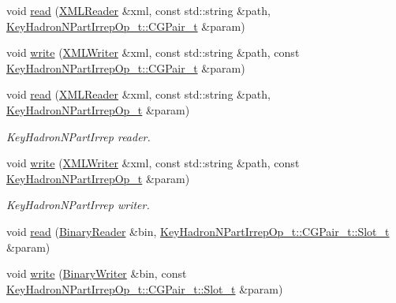\begin{DoxyCompactItemize}
\item 
void \mbox{\hyperlink{namespaceHadron_a7d8926bf48de7c75f93c8ffc8b6bab3e}{read}} (\mbox{\hyperlink{classADATXML_1_1XMLReader}{X\+M\+L\+Reader}} \&xml, const std\+::string \&path, \mbox{\hyperlink{structHadron_1_1KeyHadronNPartIrrepOp__t_1_1CGPair__t}{Key\+Hadron\+N\+Part\+Irrep\+Op\+\_\+t\+::\+C\+G\+Pair\+\_\+t}} \&param)
\item 
void \mbox{\hyperlink{namespaceHadron_ad194604b0eb61ca7e7ffa89d1ef4c879}{write}} (\mbox{\hyperlink{classADATXML_1_1XMLWriter}{X\+M\+L\+Writer}} \&xml, const std\+::string \&path, const \mbox{\hyperlink{structHadron_1_1KeyHadronNPartIrrepOp__t_1_1CGPair__t}{Key\+Hadron\+N\+Part\+Irrep\+Op\+\_\+t\+::\+C\+G\+Pair\+\_\+t}} \&param)
\item 
void \mbox{\hyperlink{namespaceHadron_ac345c2bc828c82e6774e6bc01e57535e}{read}} (\mbox{\hyperlink{classADATXML_1_1XMLReader}{X\+M\+L\+Reader}} \&xml, const std\+::string \&path, \mbox{\hyperlink{structHadron_1_1KeyHadronNPartIrrepOp__t}{Key\+Hadron\+N\+Part\+Irrep\+Op\+\_\+t}} \&param)
\begin{DoxyCompactList}\small\item\em Key\+Hadron\+N\+Part\+Irrep reader. \end{DoxyCompactList}\item 
void \mbox{\hyperlink{namespaceHadron_a6789ce2b1b787b1f3136c9a2836448a1}{write}} (\mbox{\hyperlink{classADATXML_1_1XMLWriter}{X\+M\+L\+Writer}} \&xml, const std\+::string \&path, const \mbox{\hyperlink{structHadron_1_1KeyHadronNPartIrrepOp__t}{Key\+Hadron\+N\+Part\+Irrep\+Op\+\_\+t}} \&param)
\begin{DoxyCompactList}\small\item\em Key\+Hadron\+N\+Part\+Irrep writer. \end{DoxyCompactList}\item 
void \mbox{\hyperlink{namespaceHadron_ae19da1a7e40c864440841a389b468c8d}{read}} (\mbox{\hyperlink{classADATIO_1_1BinaryReader}{Binary\+Reader}} \&bin, \mbox{\hyperlink{structHadron_1_1KeyHadronNPartIrrepOp__t_1_1CGPair__t_1_1Slot__t}{Key\+Hadron\+N\+Part\+Irrep\+Op\+\_\+t\+::\+C\+G\+Pair\+\_\+t\+::\+Slot\+\_\+t}} \&param)
\item 
void \mbox{\hyperlink{namespaceHadron_a4beaf6ce4a67fc85ae046f257141250e}{write}} (\mbox{\hyperlink{classADATIO_1_1BinaryWriter}{Binary\+Writer}} \&bin, const \mbox{\hyperlink{structHadron_1_1KeyHadronNPartIrrepOp__t_1_1CGPair__t_1_1Slot__t}{Key\+Hadron\+N\+Part\+Irrep\+Op\+\_\+t\+::\+C\+G\+Pair\+\_\+t\+::\+Slot\+\_\+t}} \&param)

\end{DoxyCompactItemize}
